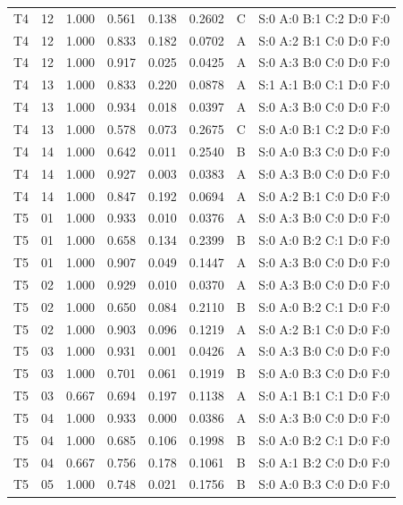 \begin{longtable}{lrrrrrll}
T4 & 12 & 1.000 & 0.561 & 0.138 & 0.2602 & C & \tiny S:0 A:0 B:1 C:2 D:0 F:0 \\
T4 & 12 & 1.000 & 0.833 & 0.182 & 0.0702 & A & \tiny S:0 A:2 B:1 C:0 D:0 F:0 \\
T4 & 12 & 1.000 & 0.917 & 0.025 & 0.0425 & A & \tiny S:0 A:3 B:0 C:0 D:0 F:0 \\
T4 & 13 & 1.000 & 0.833 & 0.220 & 0.0878 & A & \tiny S:1 A:1 B:0 C:1 D:0 F:0 \\
T4 & 13 & 1.000 & 0.934 & 0.018 & 0.0397 & A & \tiny S:0 A:3 B:0 C:0 D:0 F:0 \\
T4 & 13 & 1.000 & 0.578 & 0.073 & 0.2675 & C & \tiny S:0 A:0 B:1 C:2 D:0 F:0 \\
T4 & 14 & 1.000 & 0.642 & 0.011 & 0.2540 & B & \tiny S:0 A:0 B:3 C:0 D:0 F:0 \\
T4 & 14 & 1.000 & 0.927 & 0.003 & 0.0383 & A & \tiny S:0 A:3 B:0 C:0 D:0 F:0 \\
T4 & 14 & 1.000 & 0.847 & 0.192 & 0.0694 & A & \tiny S:0 A:2 B:1 C:0 D:0 F:0 \\
T5 & 01 & 1.000 & 0.933 & 0.010 & 0.0376 & A & \tiny S:0 A:3 B:0 C:0 D:0 F:0 \\
T5 & 01 & 1.000 & 0.658 & 0.134 & 0.2399 & B & \tiny S:0 A:0 B:2 C:1 D:0 F:0 \\
T5 & 01 & 1.000 & 0.907 & 0.049 & 0.1447 & A & \tiny S:0 A:3 B:0 C:0 D:0 F:0 \\
T5 & 02 & 1.000 & 0.929 & 0.010 & 0.0370 & A & \tiny S:0 A:3 B:0 C:0 D:0 F:0 \\
T5 & 02 & 1.000 & 0.650 & 0.084 & 0.2110 & B & \tiny S:0 A:0 B:2 C:1 D:0 F:0 \\
T5 & 02 & 1.000 & 0.903 & 0.096 & 0.1219 & A & \tiny S:0 A:2 B:1 C:0 D:0 F:0 \\
T5 & 03 & 1.000 & 0.931 & 0.001 & 0.0426 & A & \tiny S:0 A:3 B:0 C:0 D:0 F:0 \\
T5 & 03 & 1.000 & 0.701 & 0.061 & 0.1919 & B & \tiny S:0 A:0 B:3 C:0 D:0 F:0 \\
T5 & 03 & 0.667 & 0.694 & 0.197 & 0.1138 & A & \tiny S:0 A:1 B:1 C:1 D:0 F:0 \\
T5 & 04 & 1.000 & 0.933 & 0.000 & 0.0386 & A & \tiny S:0 A:3 B:0 C:0 D:0 F:0 \\
T5 & 04 & 1.000 & 0.685 & 0.106 & 0.1998 & B & \tiny S:0 A:0 B:2 C:1 D:0 F:0 \\
T5 & 04 & 0.667 & 0.756 & 0.178 & 0.1061 & B & \tiny S:0 A:1 B:2 C:0 D:0 F:0 \\
T5 & 05 & 1.000 & 0.748 & 0.021 & 0.1756 & B & \tiny S:0 A:0 B:3 C:0 D:0 F:0 \\

\end{longtable}
